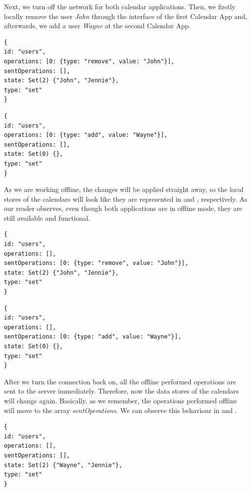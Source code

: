 Next, we turn off the network for both calendar applications. Then, we firstly locally remove the user \textit{John} through the interface of the first Calendar App and, afterwards, we add a user \textit{Wayne} at the second Calendar App.

\begin{lstlisting}[caption={The state of the users object store after offline changes at the first Calendar App.}, label={lst:ev4}]
{
id: "users",
operations: [0: {type: "remove", value: "John"}],
sentOperations: [],
state: Set(2) {"John", "Jennie"},
type: "set"
}
\end{lstlisting}
\begin{lstlisting}[caption={The state of the users object store after offline changes at the second Calendar App.}, label={lst:ev5}]
{
id: "users",
operations: [0: {type: "add", value: "Wayne"}],
sentOperations: [],
state: Set(0) {},
type: "set"
}
\end{lstlisting}

As we are working offline, the changes will be applied straight away, so the local stores of the calendars will look like they are represented in  and , respectively. As our reader observes, even though both applications are in offline mode, they are still available and functional. 

\begin{lstlisting}[caption={The state of the users object store after the connection is enabled at the first Calendar App.}, label={lst:ev6}]
{
id: "users",
operations: [],
sentOperations: [0: {type: "remove", value: "John"}],
state: Set(2) {"John", "Jennie"},
type: "set"
}
\end{lstlisting}
\begin{lstlisting}[caption={The state of the users object store after the connection is enabled at the second Calendar App.}, label={lst:ev7}]
{
id: "users",
operations: [],
sentOperations: [0: {type: "add", value: "Wayne"}],
state: Set(0) {},
type: "set"
}
\end{lstlisting}

After we turn the connection back on, all the offline performed operations are sent to the server immediately. Therefore, now the data stores of the calendars will change again. Basically, as we remember, the operations performed offline will move to the array \textit{sentOperations}. We can observe this behaviour in  and .

\begin{lstlisting}[caption={The state of the users object store for both calendars.}, label={lst:ev8}]
{
id: "users",
operations: [],
sentOperations: [],
state: Set(2) {"Wayne", "Jennie"},
type: "set"
}
\end{lstlisting}

